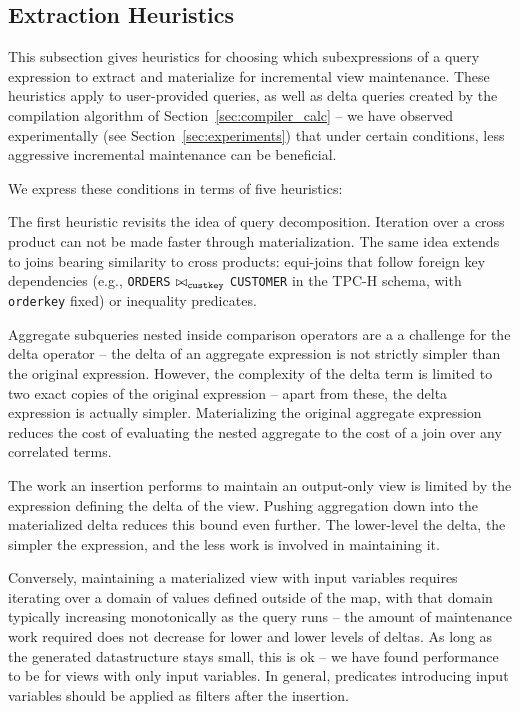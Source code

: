 \subsection{Extraction Heuristics}
\label{sec:advanced-rewriting}

This subsection gives heuristics for choosing which subexpressions of
a query expression to extract and materialize for incremental view maintenance.  These heuristics apply to user-provided queries, as well as delta queries created by the compilation algorithm of Section~\ref{sec:compiler_calc} -- we have observed experimentally (see Section~\ref{sec:experiments}) that under certain conditions, less aggressive incremental maintenance can be beneficial.

We express these conditions in terms of five heuristics:


The first heuristic revisits the idea of query decomposition.  Iteration over a cross product can not be made faster through materialization.  The same idea extends to joins bearing similarity to cross products: equi-joins that follow foreign key dependencies (e.g., {\tt ORDERS} $\bowtie_{\tt custkey}$ {\tt CUSTOMER} in the TPC-H schema, with {\tt orderkey} fixed) or inequality predicates.


Aggregate subqueries nested inside comparison operators are a a challenge for the delta operator -- the delta of an aggregate expression is not strictly simpler than the original expression.  However, the complexity of the delta term is limited to two exact copies of the original expression -- apart from these, the delta expression is actually simpler.  Materializing the original aggregate expression reduces the cost of evaluating the nested aggregate to the cost of a join over any correlated terms.


The work an insertion performs to maintain an output-only view is limited by the expression defining the delta of the view.  Pushing aggregation down into the materialized delta reduces this bound even further.  The lower-level the delta, the simpler the expression, and the less work is involved in maintaining it.

Conversely, maintaining a materialized view with input variables requires iterating over a domain of values defined outside of the map, with that domain typically increasing monotonically as the query runs -- the amount of maintenance work required does not decrease for lower and lower levels of deltas.  As long as the generated datastructure stays small, this is ok -- we have found performance to be for views with only input variables.  In general, predicates introducing input variables should be applied as filters after the insertion.


